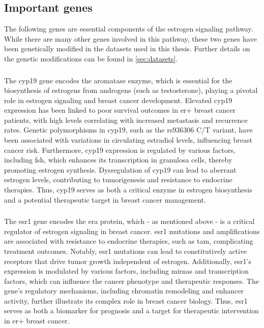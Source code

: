 \subsection{Important genes}
\label{sec:important_genes}

The following genes are essential components of the estrogen signaling pathway.
While there are many other genes involved in this pathway, these two genes have
been genetically modified in the datasets used in this thesis.
Further details on the genetic modifications can be found in
\cref{sec:datasets}.

\subsubsection{}
The \gls{cyp19} gene encodes the aromatase enzyme, which is essential for the
biosynthesis of estrogens from androgens (such as testosterone), playing a
pivotal role in estrogen signaling and breast cancer development.
Elevated \gls{cyp19} expression has been linked to poor survival outcomes in
\gls{er+} breast cancer patients, with high levels correlating with increased
metastasis and recurrence
rates\supercite{barros-oliveira_cyp19a1_2020,friesenhengst_elevated_2018}.
Genetic polymorphisms in \gls{cyp19}, such as the rs936306 C/T variant, have
been associated with variations in circulating estradiol levels, influencing
breast cancer risk\supercite{ghosh_potential_2012}.
Furthermore, \gls{cyp19} expression is regulated by various factors, including
\gls{fsh}, which enhances its transcription in granulosa cells, thereby
promoting estrogen
synthesis\supercite{savolainen-peltonen_estrogen_2018,li_microrna-7a2_2022}.
Dysregulation of \gls{cyp19} can lead to aberrant estrogen levels, contributing
to tumorigenesis and resistance to endocrine
therapies\supercite{dabydeen_comparison_2015}.
Thus, \gls{cyp19} serves as both a critical enzyme in estrogen biosynthesis and
a potential therapeutic target in breast cancer management.

\subsubsection{}
The \gls{esr1} gene encodes the \gls{era} protein, which - as mentioned above -
is a critical regulator of estrogen signaling in breast cancer.
\Gls{esr1} mutations and amplifications are associated with resistance to
endocrine
therapies, such as \gls{tam}, complicating treatment
outcomes\supercite{aguilar_biological_2010,jeselsohn_emergence_2014}.
Notably, \gls{esr1} mutations can lead to constitutively active receptors that
drive tumor growth independent of estrogen\supercite{toy_activating_2017}.
Additionally, \gls{esr1}'s expression is modulated by various factors,
including \glspl{mirna} and transcription factors, which can influence the
cancer phenotype and therapeutic responses\supercite{mansoori_mir-142-3p_2019}.
The gene's regulatory mechanisms, including chromatin remodeling and enhancer
activity, further illustrate its complex role in breast cancer
biology\supercite{powers_proteasome_2013,tomita_cluster_2015}.
Thus, \gls{esr1} serves as both a biomarker for prognosis and a target for
therapeutic intervention in \gls{er+} breast cancer.

